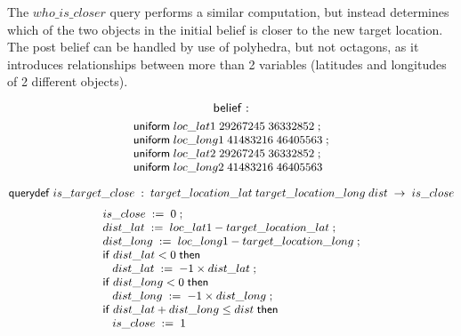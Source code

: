 The $ who\text{\_}is\text{\_}closer $ query performs a similar
computation, but instead determines which of the two objects in the
initial belief is closer to the new target location. The post belief
can be handled by use of polyhedra, but not octagons, as it introduces
relationships between more than 2 variables (latitudes and longitudes
of 2 different objects).


$$ \sbeliefk: $$
\begin{displaymath}{\small
\begin{array}{l}
  \suniform{loc\text{\_}lat1}{29267245}{36332852}\; ;\\
  \suniform{loc\text{\_}long1}{41483216}{46405563}\; ;\\
  \suniform{loc\text{\_}lat2}{29267245}{36332852}\; ;\\
  \suniform{loc\text{\_}long2}{41483216}{46405563}\\
\end{array}
}
\end{displaymath}

$$ \squerydefk \; is\text{\_}target\text{\_}close \;
: \;target\text{\_}location\text{\_}lat\;target\text{\_}location\text{\_}long\;dist \; \ra \;
is\text{\_}close$$
\begin{displaymath}{\small
\begin{array}{l}
  \sassign{is\text{\_}close}{0}\; ;\\
  \sassign{dist\text{\_}lat}{\ebinop{-}{loc\text{\_}lat1}{target\text{\_}location\text{\_}lat}}\;
  ;\\
  \sassign{dist\text{\_}long}{\ebinop{-}{loc\text{\_}long1}{target\text{\_}location\text{\_}long}}\;
  ;\\
  \sifk \; \lreln{<}{dist\text{\_}lat}{0} \; \sthenk\\
  \;\;\;\sassign{dist\text{\_}lat}{\ebinop{\times}{-1}{dist\text{\_}lat}}\;
  ;\\
  \sifk \; \lreln{<}{dist\text{\_}long}{0} \; \sthenk\\
  \;\;\;\sassign{dist\text{\_}long}{\ebinop{\times}{-1}{dist\text{\_}long}}\;
  ;\\
  \sifk \; \lreln{\leq}{\ebinop{+}{dist\text{\_}lat}{dist\text{\_}long}}{dist} \; \sthenk\\
  \;\;\;\sassign{is\text{\_}close}{1}\\
\end{array}
}
\end{displaymath}

